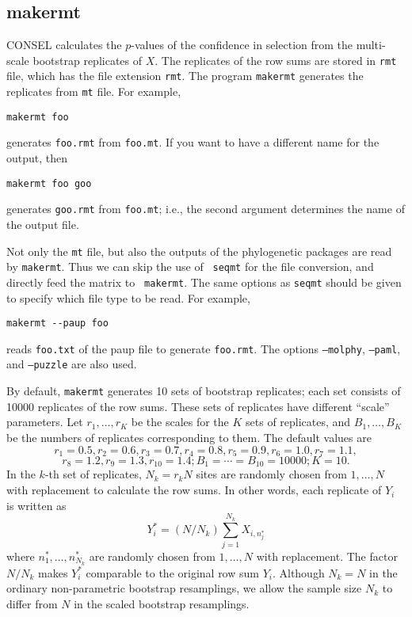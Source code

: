 \documentclass[12pt]{article}
\begin{document}
\subsection{makermt}

CONSEL calculates the $p$-values of the confidence in selection from the
multi-scale bootstrap replicates of $X$. The replicates of the row sums
are stored in {\tt rmt} file, which has the file extension {\tt rmt}.
The program {\tt makermt} generates the replicates from {\tt mt}
file. For example,
\begin{verbatim}
makermt foo
\end{verbatim}
generates {\tt foo.rmt} from {\tt foo.mt}.  If you want to have a
different name for the output, then 
\begin{verbatim}
makermt foo goo
\end{verbatim}
generates {\tt goo.rmt} from {\tt foo.mt}; i.e., the second argument
determines the name of the output file.

Not only the {\tt mt} file, but also the outputs of the phylogenetic
packages are read by {\tt makermt}. Thus we can skip the use of {\tt
seqmt} for the file conversion, and directly feed the matrix to {\tt
makermt}.  The same options as {\tt seqmt} should be given to specify
which file type to be read. For example,
\begin{verbatim}
makermt --paup foo
\end{verbatim}
reads {\tt foo.txt} of the paup file to generate {\tt foo.rmt}. The
options {\tt --molphy}, {\tt --paml}, and {\tt --puzzle} are also used.

By default, {\tt makermt} generates 10 sets of bootstrap replicates;
each set consists of 10000 replicates of the row sums.  These sets of
replicates have different ``scale'' parameters.  Let $r_1,\ldots,r_K$ be
the scales for the $K$ sets of replicates, and $B_1,\ldots,B_K$ be the
numbers of replicates corresponding to them. The default values are \[
r_1=0.5, r_2=0.6, r_3=0.7, r_4=0.8, r_5=0.9, r_6=1.0, r_7=1.1, \] \[
r_8=1.2, r_9=1.3, r_{10}=1.4; B_1 = \cdots = B_{10} = 10000; K=10.  \]
In the $k$-th set of replicates, $N_k=r_k N$ sites are randomly chosen
from $1,\ldots,N$ with replacement to calculate the row sums. In other
words, each replicate of $Y_i$ is written as \[ Y^*_{i} = (N/N_k)
\sum_{j=1}^{N_k} X_{i,n^*_j} \] where $n^*_1,\ldots,n^*_{N_k}$ are
randomly chosen from $1,\ldots,N$ with replacement. The factor $N/N_k$
makes $Y^*_i$ comparable to the original row sum $Y_i$. Although $N_k=N$
in the ordinary non-parametric bootstrap resamplings, we allow the
sample size $N_k$ to differ from $N$ in the scaled bootstrap
resamplings.
\end{document}
